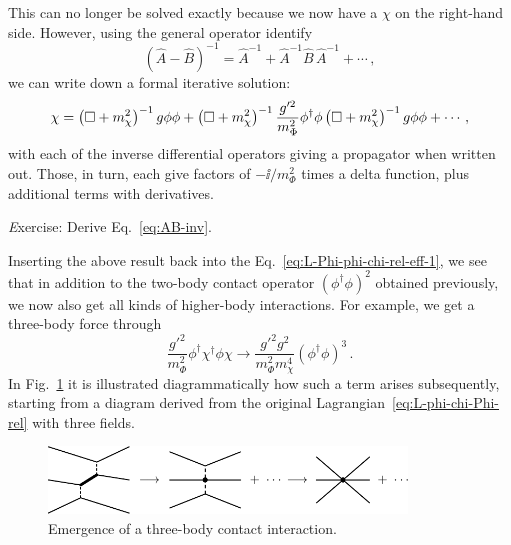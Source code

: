 %
This can no longer be solved exactly because we now have a $\chi$ on the 
right-hand side.  However, using the general operator identify
%
\begin{equation}
 \left(\hat{A}-\hat{B}\right)^{-1}
 = \hat{A}^{-1} + \hat{A}^{-1}\hat{B}\,\hat{A}^{-1} + \cdots \,,
\label{eq:AB-inv}
\end{equation}
%
we can write down a formal iterative solution:
%
\begin{equation}
 \chi = \left(\dAlem + m_\chi^2\right)^{-1} g\phi\phi
 + \left(\dAlem + m_\chi^2\right)^{-1}\frac{g'^2}{m_\Phi^2}\phi^\dagger\phi
 \left(\dAlem + m_\chi^2\right)^{-1} g\phi\phi + \cdots \,,
\label{eq:chi-g-phiphi-etc-2}
\end{equation}
%
with each of the inverse differential operators giving a propagator when 
written out.  Those, in turn, each give factors of ${-}\ii/m_\Phi^2$ times a 
delta function, plus additional terms with derivatives.

\begin{prob}
{\emph Exercise:} Derive Eq.~\eqref{eq:AB-inv}.
\end{prob}

Inserting the above result back into the Eq.~\eqref{eq:L-Phi-phi-chi-rel-eff-1}, 
we see that in addition to the two-body contact operator $(\phi^\dagger\phi)^2$ 
obtained previously, we now also get all kinds of higher-body interactions.  For 
example, we get a three-body force through
%
\begin{equation}
 \frac{g'^2}{m_\Phi^2} \phi^\dagger\chi^\dagger\phi\chi
 \rightarrow \frac{g'^2 g^2}{m_\Phi^2 m_\chi^4} (\phi^\dagger\phi)^3 \,.
\end{equation}
%
In Fig.~\ref{fig:BosonContact-3body} it is illustrated diagrammatically how 
such a term arises subsequently, starting from a diagram derived from the 
original Lagrangian~\eqref{eq:L-phi-chi-Phi-rel} with three fields.


\begin{figure}[htbp]
\centering
\includegraphics[clip,width=0.85\textwidth]{BosonContact-3body}
\caption{Emergence of a three-body contact interaction.}
\label{fig:BosonContact-3body}
\end{figure}

